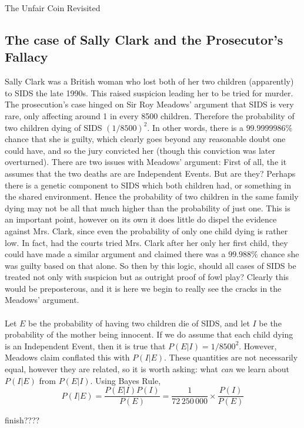 \documentclass{report}
\begin{document}
\begin{example}{The Unfair Coin Revisited}
    \todo
\end{example}
\subsection{The case of Sally Clark and the Prosecutor's Fallacy}
Sally Clark was a British woman who lost both of her two children (apparently) to SIDS the late 1990s. This raised suspicion leading her to be tried for murder. The prosecution's case hinged on Sir Roy Meadows' argument that SIDS is very rare, only affecting around 1 in every 8500 children. Therefore the probability of two children dying of SIDS $(1/8500)^2$. In other words, there is a $99.9999986\%$ chance that she is guilty, which clearly goes beyond any reasonable doubt one could have, and so the jury convicted her (though this conviction was later overturned). There are two issues with Meadows' argument:
First of all, the it assumes that the two deaths are are Independent Events. But are they? Perhaps there is a genetic component to SIDS which both children had, or something in the shared environment. Hence the probability of two children in the same family dying may not be all that much higher than the probability of just one. This is an important point, however on its own it does little do dispel the evidence against Mrs. Clark, since even the probability of only one child dying is rather low. In fact, had the courts tried Mrs. Clark after her only her first child, they could have made a similar argument and claimed there was a $99.988\%$ chance she was guilty based on that alone. So then by this logic, should all cases of SIDS be treated not only with suspicion but as outright proof of fowl play? Clearly this would be preposterous, and it is here we begin to really see the cracks in the Meadows' argument.
\\\\
Let $E$ be the probability of having two children die of SIDS, and let $I$ be the probability of the mother being innocent. If we do assume that each child dying is an Independent Event, then it is true that $P(E|I)=1/8500^2$. However, Meadows claim conflated this with $P(I|E)$. These quantities are not necessarily equal, however they are related, so it is worth asking: what \emph{can} we learn about $P(I|E)$ from $P(E|I)$. Using Bayes Rule, 
\[
    P(I|E)=\frac{P(E|I)P(I)}{P(E)}=\frac 1 {72\,250\,000}\times \frac{P(I)}{P(E)}
\]

\todo finish????
\end{document}
